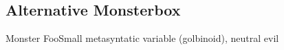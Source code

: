 \documentclass[10pt,twoside]{article}
\begin{document}
\begin{multicols}{2}
\subsection{Alternative Monsterbox}
\lipsum[1]
\begin{monster}{Monster Foo}{Small metasyntatic variable (golbinoid), neutral evil}
	\basics[%
	armorclass = 12,
	hitpoints  = 16 (3d8 + 3),
	speed      = 50 ft
	]
	\hline
	\stats[
	STR = 12 (+1),
	DEX = 14 (+2)
	]
	\hline
	\details[%
	languages = {Common Lisp, Erlang},
	]
	\hline
	\begin{monsteraction}
		\lipsum[1]
	\end{monsteraction}
\end{monster}

\end{multicols}
\end{document}
